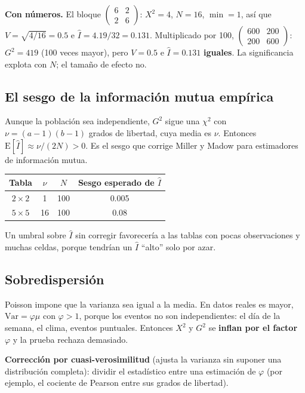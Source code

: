 \documentclass[11pt,a4paper]{article}
\begin{document}
\textbf{Con números.} El bloque $\begin{pmatrix}6&2\\2&6\end{pmatrix}$: $X^2=4$,
$N=16$, $\min=1$, así que $V=\sqrt{4/16}=0.5$ e $\hat I=4.19/32=0.131$. Multiplicado
por 100, $\begin{pmatrix}600&200\\200&600\end{pmatrix}$: $G^2=419$ (100 veces
mayor), pero $V=0.5$ e $\hat I=0.131$ \textbf{iguales}. La significancia explota con
$N$; el tamaño de efecto no.

\subsection{El sesgo de la información mutua empírica}

Aunque la población sea independiente, $G^2$ sigue una $\chi^2$ con
$\nu=(a-1)(b-1)$ grados de libertad, cuya media es $\nu$. Entonces
$\mathrm{E}[\hat I]\approx\nu/(2N)>0$. Es el sesgo que corrige Miller y Madow para
estimadores de información mutua.
\begin{center}
\begin{tabular}{cccc}
\toprule
Tabla & $\nu$ & $N$ & Sesgo esperado de $\hat I$ \\
\midrule
$2\times2$ & 1 & 100 & 0.005 \\
$5\times5$ & 16 & 100 & 0.08 \\
\bottomrule
\end{tabular}
\end{center}
Un umbral sobre $\hat I$ sin corregir favorecería a las tablas con pocas
observaciones y muchas celdas, porque tendrían un $\hat I$ ``alto'' solo por azar.

\subsection{Sobredispersión}

Poisson impone que la varianza sea igual a la media. En datos reales es mayor,
$\mathrm{Var}=\varphi\mu$ con $\varphi>1$, porque los eventos no son
independientes: el día de la semana, el clima, eventos puntuales. Entonces $X^2$ y
$G^2$ se \textbf{inflan por el factor $\varphi$} y la prueba rechaza demasiado.

\textbf{Corrección por cuasi-verosimilitud} (ajusta la varianza sin suponer una
distribución completa): dividir el estadístico entre una estimación de $\varphi$
(por ejemplo, el cociente de Pearson entre sus grados de libertad).
\end{document}
